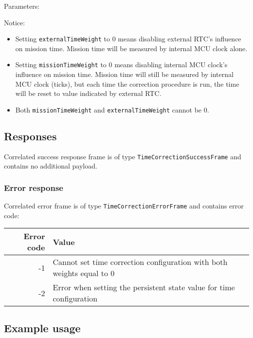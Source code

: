 Parameters:

\begin{tcarglist}
\end{tcarglist}

Notice:
\begin{itemize}
    \item Setting \texttt{externalTimeWeight} to 0 means disabling external RTC's influence on mission time. Mission time will be measured by internal MCU clock alone.
    \item Setting \texttt{missionTimeWeight} to 0 means disabling internal MCU clock's influence on mission time. Mission time will still be measured by internal MCU clock (ticks), but each time the correction procedure is run, the time will be reset to value indicated by external RTC.
    \item Both \texttt{missionTimeWeight} and \texttt{externalTimeWeight} cannot be 0.
\end{itemize}

\subsection{Responses}
Correlated success response frame is of type \texttt{TimeCorrectionSuccessFrame} and contains no additional payload.

\subsubsection{Error response}
Correlated error frame is of type \texttt{TimeCorrectionErrorFrame} and contains error code:

\begin{tabular}{r | l}
    Error code & Value \\
    \hline
    -1 & Cannot set time correction configuration with both weights equal to 0 \\
    -2 & Error when setting the persistent state value for time configuration \\
    
\end{tabular}

\subsection{Example usage}
